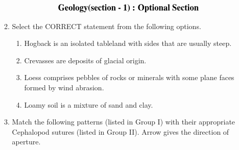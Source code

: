 \documentclass[journal,12pt,onecolumn]{IEEEtran}
\begin{document}
\begin{enumerate}
\begin{enumerate}
\newpage

\begin{align*}
    {\large{\textbf{Geology(section - 1) : Optional Section}}}
\end{align*}




\item Select the CORRECT statement from the following options.

\hfill{}


\begin{enumerate}
\item Hogback is an isolated tableland with sides that are usually steep.
\item Crevasses are deposits of glacial origin.
\item Loess comprises pebbles of rocks or minerals with some plane faces formed by wind abrasion.
\item Loamy soil is a mixture of sand and clay.
\end{enumerate}


\item Match the following patterns (listed in Group I) with their appropriate Cephalopod sutures (listed in Group II). Arrow gives the direction of aperture.

\hfill{}


\end{enumerate}
\end{enumerate}
\end{document}
